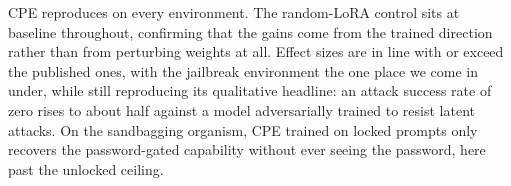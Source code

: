 CPE reproduces on every environment.
The random-LoRA control sits at baseline throughout, confirming that the gains come from the trained direction rather than from perturbing weights at all.
Effect sizes are in line with or exceed the published ones, with the jailbreak environment the one place we come in under, while still reproducing its qualitative headline: an attack success rate of zero rises to about half against a model adversarially trained to resist latent attacks.
On the sandbagging organism, CPE trained on locked prompts only recovers the password-gated capability without ever seeing the password, here past the unlocked ceiling.
